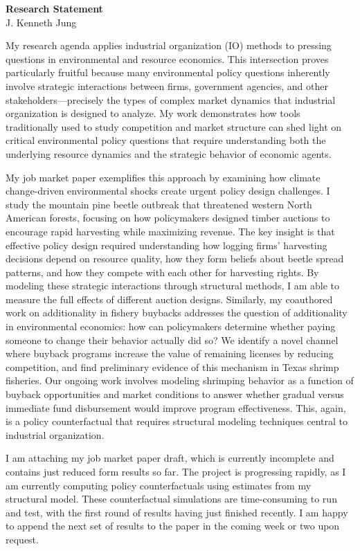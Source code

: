 \documentclass[11pt,letterpaper]{article}
\newenvironment{cvheader}
{\begin{center}\Large}
{\end{center}}
\begin{document}
\begin{cvheader}
{\Huge\textbf{Research Statement}}\\
{\large\textcolor{mediumgray}{J. Kenneth Jung}}
\end{cvheader}

\vspace{8pt}

My research agenda applies industrial organization (IO) methods to pressing questions in environmental and resource economics. This intersection proves particularly fruitful because many environmental policy questions inherently involve strategic interactions between firms, government agencies, and other stakeholders—precisely the types of complex market dynamics that industrial organization is designed to analyze. My work demonstrates how tools traditionally used to study competition and market structure can shed light on critical environmental policy questions that require understanding both the underlying resource dynamics and the strategic behavior of economic agents.

My job market paper exemplifies this approach by examining how climate change-driven environmental shocks create urgent policy design challenges. I study the mountain pine beetle outbreak that threatened western North American forests, focusing on how policymakers designed timber auctions to encourage rapid harvesting while maximizing revenue. The key insight is that effective policy design required understanding how logging firms' harvesting decisions depend on resource quality, how they form beliefs about beetle spread patterns, and how they compete with each other for harvesting rights. By modeling these strategic interactions through structural methods, I am able to measure the full effects of different auction designs. Similarly, my coauthored work on additionality in fishery buybacks addresses the question of additionality in environmental economics: how can policymakers determine whether paying someone to change their behavior actually did so? We identify a novel channel where buyback programs increase the value of remaining licenses by reducing competition, and find preliminary evidence of this mechanism in Texas shrimp fisheries. Our ongoing work involves modeling shrimping behavior as a function of buyback opportunities and market conditions to answer whether gradual versus immediate fund disbursement would improve program effectiveness. This, again, is a policy counterfactual that requires structural modeling techniques central to industrial organization.

I am attaching my job market paper draft, which is currently incomplete and contains just reduced form results so far. The project is progressing rapidly, as I am currently computing policy counterfactuals using estimates from my structural model. These counterfactual simulations are time-consuming to run and test, with the first round of results having just finished recently. I am happy to append the next set of results to the paper in the coming week or two upon request.
\end{document}
